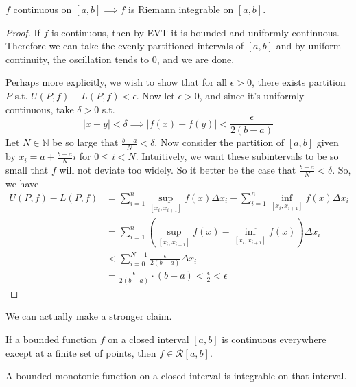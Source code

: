   \begin{theorem}
    $f$ continuous on $[a, b] \implies f$ is Riemann integrable on $[a, b]$. 
  \end{theorem}
  \begin{proof}
    If $f$ is continuous, then by EVT it is bounded and uniformly continuous. Therefore we can take the evenly-partitioned intervals of $[a, b]$ and by uniform continuity, the oscillation tends to $0$, and we are done. 

    Perhaps more explicitly, we wish to show that for all $\epsilon > 0$, there exists partition $P$ s.t. $U(P, f) - L(P, f) < \epsilon$. Now let $\epsilon > 0$, and since it's uniformly continuous, take $\delta > 0$ s.t. 
    \begin{equation}
      |x - y| < \delta \implies |f(x) - f(y)| < \frac{\epsilon}{2(b-a)}
    \end{equation}
    Let $N \in \mathbb{N}$ be so large that $\frac{b-a}{N} < \delta$. Now consider the partition of $[a, b]$ given by $x_i = a + \frac{b-a}{N} i$ for $0 \leq i < N$. Intuitively, we want these subintervals to be so small that $f$ will not deviate too widely. So it better be the case that $\frac{b - a}{N} < \delta$. So, we have
    \begin{align}
      U(P, f) - L(P, f) & = \sum_{i=1}^n \sup_{[x_i, x_{i+1}]} f(x) \Delta x_i - \sum_{i=1}^n \inf_{[x_i, x_{i+1}]} f(x) \Delta x_i \\ 
                        & = \sum_{i=1}^n (\sup_{[x_i, x_{i+1}]} f(x) - \inf_{[x_i, x_{i+1}]} f(x) ) \Delta x_i \\ 
                        & < \sum_{i=0}^{N-1} \frac{\epsilon}{2 (b - a)} \Delta x_i \\
                        & = \frac{\epsilon}{2 (b - a)} \cdot (b - a) < \frac{\epsilon}{2} < \epsilon
    \end{align}
  \end{proof}

  We can actually make a stronger claim. 

  \begin{corollary}
    If a bounded function $f$ on a closed interval $[a, b]$ is continuous everywhere except at a finite set of points, then $f \in \mathcal{R}[a, b]$. 
  \end{corollary}

  \begin{corollary}
    A bounded monotonic function on a closed interval is integrable on that interval. 
  \end{corollary} 


